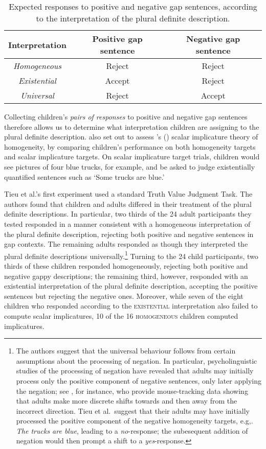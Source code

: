 \documentclass[12pt, letterpaper]{article}
\newcommand\posscite[1]{\citeauthor{#1}'s (\citeyear{#1})}
\begin{document}
{\begin{table}[h]
\centering
\begin{tabular}{ c | c | c } 
\textbf{Interpretation} & \textbf{Positive gap sentence} & \textbf{Negative gap sentence} \\
\hline
\hline
\textit{Homogeneous} & Reject & Reject \\
\hline
\textit{Existential} & Accept & Reject \\
\hline
\textit{Universal} & Reject & Accept \\
\hline
\end{tabular}
\caption{Expected responses to positive and negative gap sentences, according to the interpretation of the plural definite description.}
\label{hmgexpect}
\end{table}

Collecting children's \textit{pairs of responses} to positive and negative gap sentences therefore allows us to determine what interpretation children are assigning to the plural definite description. \cite{Tieu:2015i,Tieu:2015k} also set out to assess \posscite{Magri:2014} scalar implicature theory of homogeneity, by comparing children's performance on both homogeneity targets and scalar implicature targets. On scalar implicature target trials, children would see pictures of four blue trucks, for example, and be asked to judge existentially quantified sentences such as `Some trucks are blue.' 

Tieu et al.'s first experiment used a standard Truth Value Judgment Task. The authors found that children and adults differed in their treatment of the plural definite descriptions. In particular, two thirds of the 24 adult participants they tested responded in a manner consistent with a homogeneous interpretation of the plural definite description, rejecting both positive and negative sentences in gap contexts. The remaining adults responded as though they interpreted the plural definite descriptions universally.\footnote{The authors suggest that the universal behaviour follows from certain assumptions about the processing of negation. In particular, psycholinguistic studies of the processing of negation have revealed that adults may initially process only the positive component of negative sentences, only later applying the negation; see \cite{Dale:2011}, for instance, who provide mouse-tracking data showing that adults make more discrete shifts towards and then away from the incorrect direction. Tieu et al.~suggest that their adults may have initially processed the positive component of the negative homogeneity targets, e.g,. \textit{The trucks are blue}, leading to a \textit{no}-response; the subesequent addition of negation would then prompt a shift to a \textit{yes}-response.} Turning to the 24 child participants, two thirds of these children responded homogeneously, rejecting both positive and negative gappy descriptions; the remaining third, however, responded with an existential interpretation of the plural definite description, accepting the positive sentences but rejecting the negative ones. Moreover, while seven of the eight children who responded according to the \textsc{existential} interpretation also failed to compute scalar implicatures, 10 of the 16 \textsc{homogeneous} children computed implicatures.

}
\end{document}

